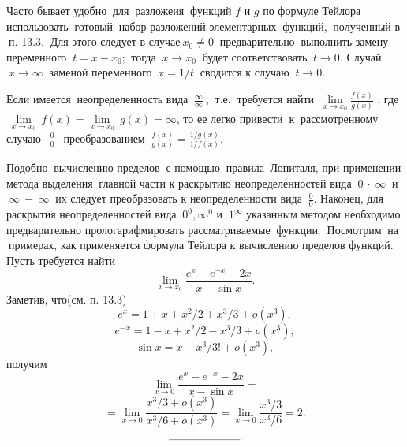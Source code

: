 \documentclass{article}
\begin{document}
\begin{large}
\newpage

\setlength{\parindent}{0.7cm} Часто бывает удобно$\ $ для $\ $разложеия$\ $ функций $f$ и $g$ по формуле Тейлора$\ $ использовать $\ $готовый$\ $ набор разложений элементарных$\ $ функций,$\ $ полученный в $\ $п. 13.3.$\ $ Для этого следует в случае$\ x_0 \not= 0\ $ предварительно$\ $ выполнить замену переменного $\ t=x-x_0$;$\ $ тогда $\ x\to x_0\ $ будет соответствовать $\ t\to 0$. Случай $\ x\to \infty \ $ заменой переменного $\ x = 1/t \ $ сводится к случаю $\ t\to 0$. 

Если имеется $\ $неопределенность вида $\ \frac{\infty}{\infty}\ $, $\ $т.е. $\ $требуется найти $\ \lim\limits_{x\to x_0}\frac{f(x)}{g(x)}$ , где $\ \lim\limits_{x\to x_0}\ f(x)=\lim\limits_{x\to x_0}\ g(x)=\infty$, то ее легко привести $\ $к$\ $ рассмотренному $\ $случаю $\ \ \frac{0}{0}$ $\ \ $преобразованием $\ \frac{f(x)}{g(x)} = \frac{1/g(x)}{1/f(x)}$.

Подобно $\ $вычислению пределов$\ $ с помощью $\ $правила$\ $ Лопиталя, при применении$\ $ метода выделения $\ $главной части к раскрытию неопределенностей вида $\ 0\ \cdot \  \infty\ $ и $\ \infty\ -\ \infty\ $ их следу\-ет преобразовать к неопределенности вида $\ \frac{0}{0}$. Наконец, для раскрытия неопределенностей вида $\ 0^0, \infty^0$ и $\ 1^\infty$ указанным методом необходимо предварительно прологарифмировать рассматриваемые$\ $ функции. $\ $Посмотрим $\ $на $\ $примерах, как применяется формула Тейлора к вычислению пределов функций. Пусть требуется найти
$$\lim\limits_{x\to x_0}\frac{e^x-e^{-x}-2x}{x-\sin x}.$$
Заметив, что(см. п. 13.3)
$$e^x = 1+x+x^2/2+x^3/3+o(x^3),$$
$$e^{-x} = 1-x+x^2/2-x^3/3+o(x^3),$$
$$\sin x = x-x^3/3!+o(x^3),$$
получим
$$\lim\limits_{x\to 0}\frac{e^x-e^{-x}-2x}{x-\sin x} =$$
$$= \lim\limits_{x\to 0}\frac{x^3/3+o(x^3)}{x^3/6+o(x^3)}= \lim\limits_{x\to 0}\frac{x^3/3}{x^3/6}=2.$$


$$\\ \\ \\ \rule{65pt}{0.01cm}$$
\end{large}
\end{document}
